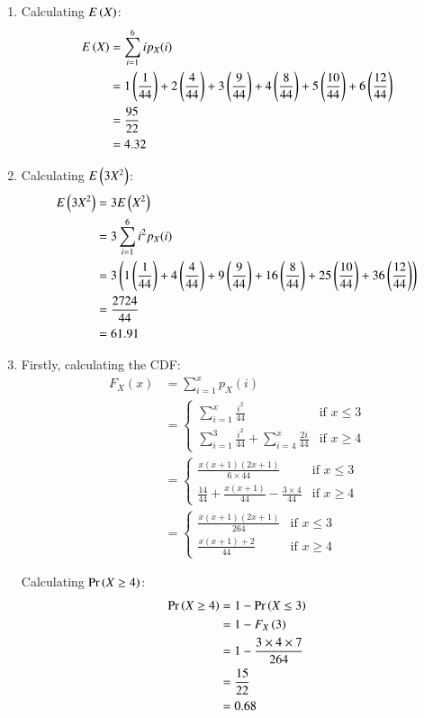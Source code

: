 \documentclass[journal,24pt,onecolumn]{IEEEtran}
\theoremstyle{remark}
\begin{document}
\begin{enumerate}
    \item Calculating $E\left(X\right)$:
    \begin{align}
        E\left(X\right) 
        &= \sum_{i = 1}^{6} ip_X(i)\\
        &= 1\left(\frac{1}{44}\right) + 2\left(\frac{4}{44}\right) + 3\left(\frac{9}{44}\right) + 4\left(\frac{8}{44}\right) + 5\left(\frac{10}{44}\right) + 6\left(\frac{12}{44}\right)\\
        &= \frac{95}{22}\\
        &= 4.32
    \end{align}
    \item Calculating $E\left(3X^2\right)$:
    \begin{align}
        E\left(3X^2\right) &= 3E\left(X^2\right)\\
        &= 3\sum_{i = 1}^{6} i^2 p_{X}(i)\\
        &= 3\left(1\left(\frac{1}{44}\right) + 4\left(\frac{4}{44}\right) + 9\left(\frac{9}{44}\right) + 16\left(\frac{8}{44}\right) + 25\left(\frac{10}{44}\right) + 36\left(\frac{12}{44}\right)\right)\\
        &= \frac{2724}{44}\\
        &= 61.91
    \end{align}
    \item Firstly, calculating the CDF:
    \begin{align}
        F_X(x) &= \sum_{i = 1}^{x} p_X(i)\\ &= 
        \begin{cases}
            \sum_{i = 1}^{x} \frac{i^2}{44} & \text{if } x \leq 3\\
            \sum_{i = 1}^{3} \frac{i^2}{44} + \sum_{i = 4}^{x} \frac{2i}{44} & \text{if } x \geq 4
        \end{cases}\\
        &=
        \begin{cases}
            \frac{x(x+1)(2x+1)}{6 \times 44} & \text{if } x \leq 3\\
            \frac{14}{44} + \frac{x(x+1)}{44} - \frac{3 \times 4}{44} & \text{if } x \geq 4
        \end{cases}\\
        &=
        \begin{cases}
            \frac{x(x+1)(2x+1)}{264} & \text{if } x \leq 3\\
            \frac{x(x+1) + 2}{44} & \text{if } x \geq 4
        \end{cases}
    \end{align}
    
    Calculating $\Pr\left(X \geq 4\right)$:
    \begin{align}
        \Pr\left(X \geq 4\right) &= 1 - \Pr\left(X \leq 3\right)\\
        &= 1 - F_X\left(3\right)\\
        &= 1 - \frac{3 \times 4 \times 7}{264}\\
        &= \frac{15}{22}\\
        &= 0.68
    \end{align}
\end{enumerate}
\end{document}
